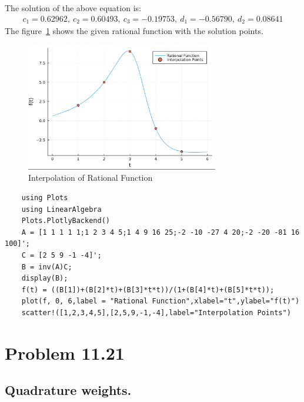 \documentclass{article}
\begin{document}
The solution of the above equation is:
\begin{align*}
c_1 = 0.62962,\ c_2 = 0.60493,\ c_3 =-0.19753,\ d_1 =-0.56790,\ d_2 =0.08641
\end{align*}
The figure~\ref{fig:inter} shows the given rational function with the solution points.
\begin{figure}
    \centering
    \includegraphics[width=0.75\textwidth]{Interpolation_Rational_Function.png}
    \caption{Interpolation of Rational Function}
    \label{fig:inter}
\end{figure}
\begin{verbatim}
    using Plots
    using LinearAlgebra
    Plots.PlotlyBackend()
    A = [1 1 1 1 1;1 2 3 4 5;1 4 9 16 25;-2 -10 -27 4 20;-2 -20 -81 16 100]';
    C = [2 5 9 -1 -4]';
    B = inv(A)C;
    display(B);
    f(t) = ((B[1])+(B[2]*t)+(B[3]*t*t))/(1+(B[4]*t)+(B[5]*t*t));
    plot(f, 0, 6,label = "Rational Function",xlabel="t",ylabel="f(t)")
    scatter!([1,2,3,4,5],[2,5,9,-1,-4],label="Interpolation Points")
    \end{verbatim}
\section*{Problem 11.21}
\subsection*{Quadrature weights.}
\end{document}
